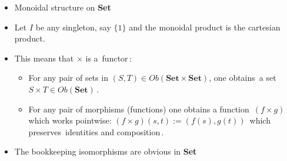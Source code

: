 \begin{itemize}
    \item Monoidal structure on \textbf{Set}
    \item Let $I$ be any singleton, say $\{1\}$ and the monoidal product is the cartesian product.
    \item This means that $\times$ is a \,functor\,:
          \begin{itemize}
            \item For any pair of sets in $(S,T) \in Ob(\mathbf{Set}\times\mathbf{Set})$, one obtains \,a set $S \times T \in Ob(\mathbf{Set})$\,.
            \item For any pair of morphisms (functions) one obtains a function \,$(f\times g)$ which works pointwise: $(f\times g)(s,t):=(f(s),g(t))$\, which preserves \,identities and composition\,.
          \end{itemize}
    \item The bookkeeping isomorphisms are obvious in \textbf{Set}

  \end{itemize}
